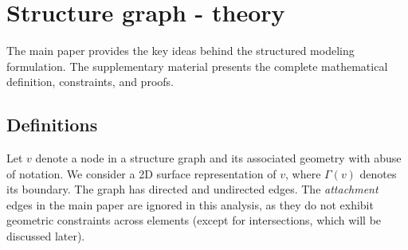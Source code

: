 \section{Structure graph - theory}

The main paper provides the key ideas behind the structured modeling
formulation. The supplementary material presents the complete
mathematical definition, constraints, and proofs.

\subsection{Definitions}

Let $v$ denote a node in a structure graph and its associated geometry
with abuse of notation. We consider a 2D surface representation of $v$,
where $\Gamma(v)$ denotes its boundary.
%
The graph has directed and undirected edges. The {\em attachment}
edges in the main paper are ignored in this analysis, as they do not exhibit
geometric constraints across elements (except for intersections, which
will be discussed later).
%


